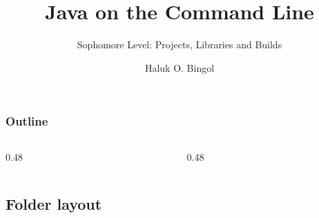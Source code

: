 \documentclass[aspectratio=169,10pt,compress]{beamer}
\title{Java on the Command Line}
\subtitle{Sophomore Level: Projects, Libraries and Builds}
\author[Bingol]{Haluk O. Bingol}
\institute[FCIS]{
    Faculty of Computer and Information Sciences\\
    Yeditepe University
}
\date{
	{\tiny \hbTimeStamp}
}
\begin{document}
\begin{frame}[t,fragile]
  \titlepage
\end{frame}




\begin{frame}[t,fragile] \frametitle{Outline}
  \begin{columns}[T]
    \begin{column}{0.48\textwidth}
      \tableofcontents[sections={1-3}, hideallsubsections]
    \end{column}
    \begin{column}{0.48\textwidth}
      \tableofcontents[sections={4-6}, hideallsubsections]
    \end{column}
  \end{columns}
\end{frame}


\subsection[Layout]{Folder layout}
\end{document}

